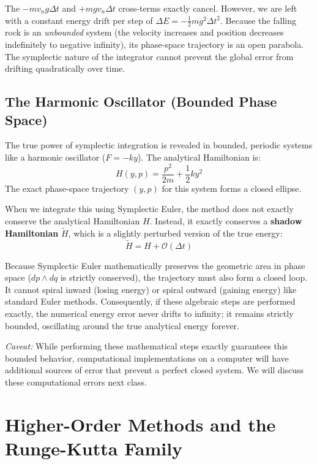 \documentclass[11pt]{article}
\begin{document}
The $-mv_n g \Delta t$ and $+mgv_n\Delta t$ cross-terms exactly cancel. However, we are left with a constant energy drift per step of $\Delta E = -\frac{1}{2}mg^2\Delta t^2$. Because the falling rock is an \textit{unbounded} system (the velocity increases and position decreases indefinitely to negative infinity), its phase-space trajectory is an open parabola. The symplectic nature of the integrator cannot prevent the global error from drifting quadratically over time.

\subsection{The Harmonic Oscillator (Bounded Phase Space)}
The true power of symplectic integration is revealed in bounded, periodic systems like a harmonic oscillator ($F = -ky$). The analytical Hamiltonian is:
\begin{equation}
    H(y, p) = \frac{p^2}{2m} + \frac{1}{2}ky^2
\end{equation}
The exact phase-space trajectory $(y, p)$ for this system forms a closed ellipse. 

When we integrate this using Symplectic Euler, the method does not exactly conserve the analytical Hamiltonian $H$. Instead, it exactly conserves a \textbf{shadow Hamiltonian} $\tilde{H}$, which is a slightly perturbed version of the true energy:
\begin{equation}
    \tilde{H} = H + \mathcal{O}(\Delta t)
\end{equation}

Because Symplectic Euler mathematically preserves the geometric area in phase space ($dp \wedge dq$ is strictly conserved), the trajectory must also form a closed loop. It cannot spiral inward (losing energy) or spiral outward (gaining energy) like standard Euler methods. Consequently, if these algebraic steps are performed exactly, the numerical energy error never drifts to infinity; it remains strictly bounded, oscillating around the true analytical energy forever. 

\textit{Caveat:} While performing these mathematical steps exactly guarantees this bounded behavior, computational implementations on a computer will have additional sources of error that prevent a perfect closed system. We will discuss these computational errors next class.

\section{Higher-Order Methods and the Runge-Kutta Family}
\end{document}
